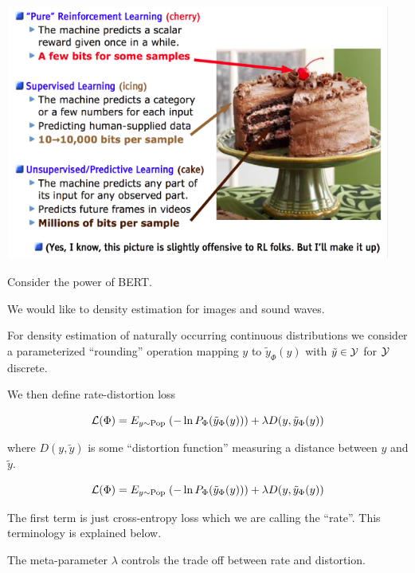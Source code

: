 {%


\centerline{\includegraphics[width = 6in]{../images/cake}}

\vfill
Consider the power of BERT.

\vfill
We would like to density estimation for images and sound waves.

For density estimation of naturally occurring continuous distributions we consider
a parameterized ``rounding'' operation mapping $y$ to $\tilde{y}_\Phi(y)$ with $\tilde{y} \in {\cal Y}$ for ${\cal Y}$ discrete.

\vfill
We then define rate-distortion loss

\vfill
$${\cal L}(\Phi) = E_{y \sim \mathrm{Pop}}\;(- \ln P_\Phi(\tilde{y}_\Phi(y))) + \lambda D(y,\tilde{y}_\Phi(y))$$

\vfill
where $D(y,\tilde{y})$ is some ``distortion function'' measuring a distance between $y$ and $\tilde{y}$.


$${\cal L}(\Phi) = E_{y \sim \mathrm{Pop}}\;(- \ln P_\Phi(\tilde{y}_\Phi(y))) + \lambda D(y,\tilde{y}_\Phi(y))$$

\vfill
The first term is just cross-entropy loss which we are calling the ``rate''.  This terminology is explained below.

\vfill
The meta-parameter $\lambda$ controls the trade off between rate and distortion.


}
